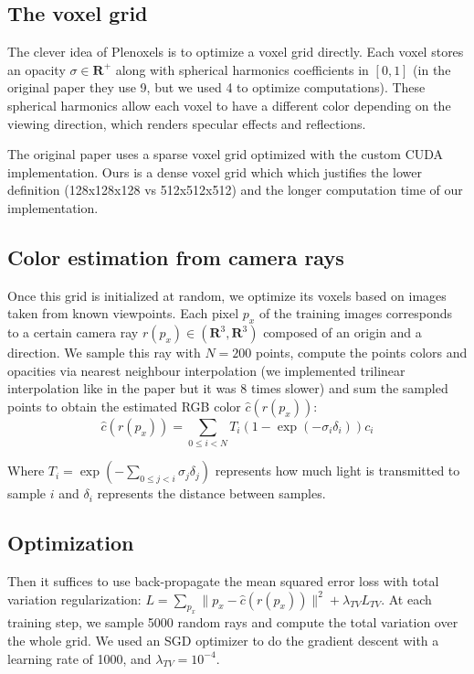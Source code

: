 \documentclass{article}
\begin{document}
\subsection{The voxel grid}

The clever idea of Plenoxels is to optimize a voxel grid directly. Each voxel stores an opacity $\sigma \in \mathbf{R}^+$ along with spherical harmonics coefficients in $[0,1]$ (in the original paper they use 9, but we used 4 to optimize computations). These spherical harmonics allow each voxel to have a different color depending on the viewing direction, which renders specular effects and reflections.

The original paper uses a sparse voxel grid optimized with the custom CUDA implementation. Ours is a dense voxel grid which which justifies the lower definition (128x128x128 vs 512x512x512) and the longer computation time of our implementation.

\subsection{Color estimation from camera rays}

Once this grid is initialized at random, we optimize its voxels based on images taken from known viewpoints. Each pixel $p_x$ of the training images corresponds to a certain camera ray $r(p_x) \in (\mathbf{R}^3, \mathbf{R}^3)$ composed of an origin and a direction. We sample this ray with $N=200$ points, compute the points colors and opacities via nearest neighbour interpolation (we implemented trilinear interpolation like in the paper but it was 8 times slower) and sum the sampled points to obtain the estimated RGB color $\hat{c}(r(p_x))$:
\[\hat{c}(r(p_x)) = \sum_{0\leq i<N} T_i (1 - \exp(-\sigma_i \delta_i)) c_i\] 

Where $ T_i = \exp(- \sum_{0\leq j<i} \sigma_j \delta_j)$ represents how much light is transmitted to sample $i$ and $\delta_i$ represents the distance between samples.


\subsection{Optimization}
Then it suffices to use back-propagate the mean squared error loss with total variation regularization: $L = \sum_{p_x} \|p_x -\hat{c}(r(p_x)) \|^2 + \lambda_{TV}  L_{TV}$. At each training step, we sample 5000 random rays and compute the total variation over the whole grid. We used an SGD optimizer to do the gradient descent with a learning rate of 1000, and $\lambda_{TV} = 10^{-4}$. 
\end{document}
